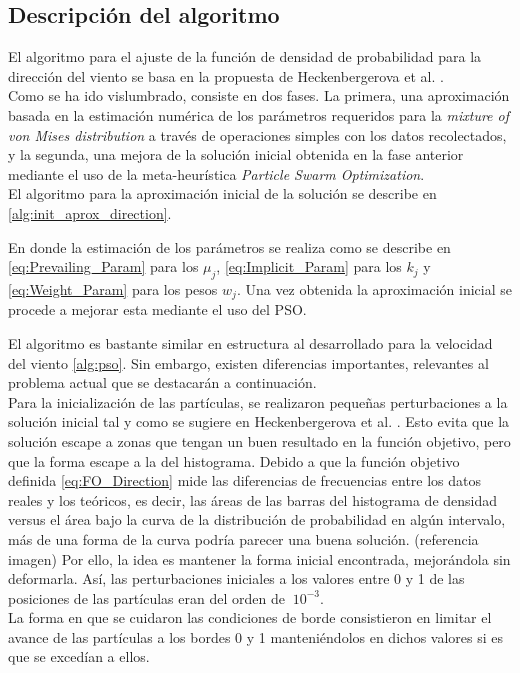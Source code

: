 \subsection{Descripción del algoritmo}
El algoritmo para el ajuste de la función de densidad de probabilidad para la dirección del viento se basa en la propuesta de Heckenbergerova et al. \cite{Heckenbergerova15}.\\ 
Como se ha ido vislumbrado, consiste en dos fases. La primera, una aproximación basada en la estimación numérica de los parámetros requeridos para la \emph{mixture of von Mises distribution} a través de operaciones simples con los datos recolectados, y la segunda, una mejora de la solución inicial obtenida en la fase anterior mediante el uso de la meta-heurística \emph{Particle Swarm Optimization}. \\
El algoritmo para la aproximación inicial de la solución se describe en \ref{alg:init_aprox_direction}.

En donde la estimación de los parámetros se realiza como se describe en \ref{eq:Prevailing_Param} para los $\mu_j$, \ref{eq:Implicit_Param} para los $k_j$ y \ref{eq:Weight_Param} para los pesos $w_j$.
Una vez obtenida la aproximación inicial se procede a mejorar esta mediante el uso del PSO.

El algoritmo es bastante similar en estructura al desarrollado para la velocidad del viento \ref{alg:pso}. Sin embargo,
existen diferencias importantes, relevantes al problema actual que se destacarán a continuación.\\
Para la inicialización de las partículas, se realizaron pequeñas perturbaciones a la solución inicial tal y como se sugiere en Heckenbergerova et al. \cite{Heckenbergerova15}. Esto evita que la solución escape a zonas que tengan un buen resultado en la función objetivo, pero que la forma escape a la del histograma. Debido a que la función objetivo definida \ref{eq:FO_Direction} mide las diferencias de frecuencias entre los datos reales y los teóricos, es decir, las áreas de las barras del histograma de densidad versus el área bajo la curva de la distribución de probabilidad en algún intervalo, más de una forma de la curva podría parecer una buena solución. (referencia imagen) Por ello, la idea es mantener la forma inicial encontrada, mejorándola sin deformarla. Así, las perturbaciones iniciales a los valores entre 0 y 1  de las posiciones de las partículas eran del orden de $~ 10^{-3}$.\\
La forma en que se cuidaron las condiciones de borde consistieron en limitar el avance de las partículas a los bordes 0 y 1 manteniéndolos en dichos valores si es que se excedían a ellos.\\
